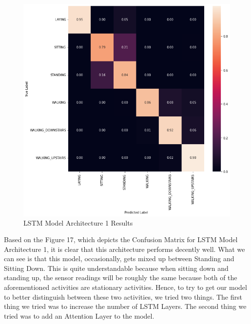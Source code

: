 \documentclass[conference]{IEEEtran}
\begin{document}
\begin{figure}[h!]
	\includegraphics[width= 0.9 \linewidth]{LSTM(1)_Results.png}
	\centering
	\caption{LSTM Model Architecture 1 Results}
	\label{LSTM(1)_Results.png}
\end{figure}

Based on the Figure 17, which depicts the Confusion Matrix for LSTM Model Architecture 1, it is clear that this architecture performs decently well. What we can see is that this model, occasionally, gets mixed up between Standing and Sitting Down. This is quite understandable because when sitting down and standing up, the sensor readings will be roughly the same because both of the aforementioned activities are stationary activities. Hence, to try to get our model to better distinguish between these two activities, we tried two things. The first thing we tried was to increase the number of LSTM Layers. The second thing we tried was to add an Attention Layer to the model. 
\end{document}
